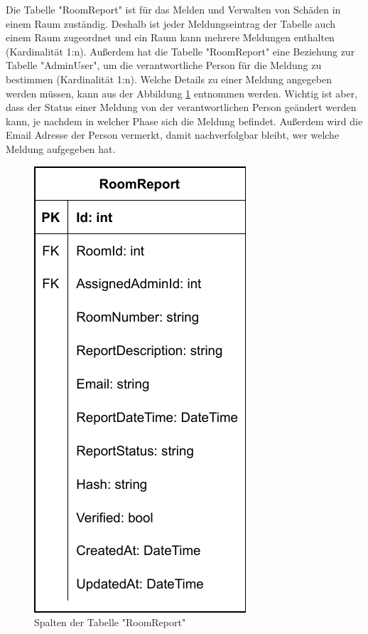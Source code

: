 \pagebreak


Die Tabelle "RoomReport" ist für das Melden und Verwalten von Schäden in einem Raum zuständig. Deshalb ist jeder Meldungseintrag der Tabelle auch einem Raum zugeordnet und ein Raum kann mehrere Meldungen enthalten (Kardinalität 1:n). Außerdem hat die Tabelle "RoomReport" eine Beziehung zur Tabelle "AdminUser",  um die verantwortliche Person für die Meldung zu bestimmen (Kardinalität 1:n). Welche Details zu einer Meldung angegeben werden müssen, kann aus der Abbildung \ref{fig:RoomReportColls} entnommen werden. Wichtig ist aber, dass der Status einer Meldung von der verantwortlichen Person geändert werden kann, je nachdem in welcher Phase sich die Meldung befindet. Außerdem wird die Email Adresse der Person vermerkt, damit nachverfolgbar bleibt, wer welche Meldung aufgegeben hat.

\begin{figure}[H]
    \centering
    \includegraphics{media/MariaDB/RoomReport.svg.pdf}
    \caption{Spalten der Tabelle "RoomReport"}
    \label{fig:RoomReportColls}
\end{figure}

